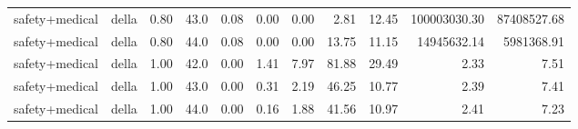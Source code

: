 \documentclass{article}
\begin{document}
\begin{table}[H]
{\begin{tabular}{llllrrrrrrr}
safety+medical & della & 0.80 & 43.0 & 0.08 & 0.00 & 0.00 & 2.81 & 12.45 & 100003030.30 & 87408527.68 \\
safety+medical & della & 0.80 & 44.0 & 0.08 & 0.00 & 0.00 & 13.75 & 11.15 & 14945632.14 & 5981368.91 \\
safety+medical & della & 1.00 & 42.0 & 0.00 & 1.41 & 7.97 & 81.88 & 29.49 & 2.33 & 7.51 \\
safety+medical & della & 1.00 & 43.0 & 0.00 & 0.31 & 2.19 & 46.25 & 10.77 & 2.39 & 7.41 \\
safety+medical & della & 1.00 & 44.0 & 0.00 & 0.16 & 1.88 & 41.56 & 10.97 & 2.41 & 7.23 \\
\bottomrule
\end{tabular}
}
\end{table}

\end{document}
